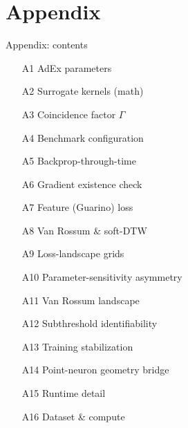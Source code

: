 \documentclass[17pt, t, lualatex]{beamer}
\begin{document}
\appendix
\section{Appendix}
\insertsectionpage

\begin{frame}{Appendix: contents}
\small
\begin{multicols}{2}
\begin{itemize}
  \item[A1] AdEx parameters
  \item[A2] Surrogate kernels (math)
  \item[A3] Coincidence factor $\Gamma$
  \item[A4] Benchmark configuration
  \item[A5] Backprop-through-time
  \item[A6] Gradient existence check
  \item[A7] Feature (Guarino) loss
  \item[A8] Van Rossum \& soft-DTW
  \item[A9] Loss-landscape grids
  \item[A10] Parameter-sensitivity asymmetry
  \item[A11] Van Rossum landscape
  \item[A12] Subthreshold identifiability
  \item[A13] Training stabilization
  \item[A14] Point-neuron geometry bridge
  \item[A15] Runtime detail
  \item[A16] Dataset \& compute
\end{itemize}
\end{multicols}
\end{frame}
\end{document}
